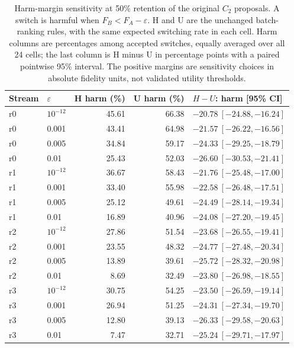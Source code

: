 \begin{table}[ht]
\centering
\scriptsize
\setlength{\tabcolsep}{3pt}
\caption{Harm-margin sensitivity at 50\% retention of the original $C_2$ proposals. A switch is harmful when $F_B<F_A-\varepsilon$. H and U are the unchanged batch-ranking rules, with the same expected switching rate in each cell. Harm columns are percentages among accepted switches, equally averaged over all 24 cells; the last column is H minus U in percentage points with a paired pointwise 95\% interval. The positive margins are sensitivity choices in absolute fidelity units, not validated utility thresholds.}
\label{tab:r4-harm-sensitivity}
\begin{tabular}{@{}llrrl@{}}
\toprule
Stream & $\varepsilon$ & H harm (\%) & U harm (\%) & $H-U$: harm [95\% CI] \\
\midrule
r0 & $10^{-12}$ & 45.61 & 66.38 & $-20.78\ [-24.88,-16.24]$ \\
r0 & 0.001 & 43.41 & 64.98 & $-21.57\ [-26.22,-16.56]$ \\
r0 & 0.005 & 34.84 & 59.17 & $-24.33\ [-29.25,-18.79]$ \\
r0 & 0.01 & 25.43 & 52.03 & $-26.60\ [-30.53,-21.41]$ \\
r1 & $10^{-12}$ & 36.67 & 58.43 & $-21.76\ [-25.48,-17.00]$ \\
r1 & 0.001 & 33.40 & 55.98 & $-22.58\ [-26.48,-17.51]$ \\
r1 & 0.005 & 25.12 & 49.61 & $-24.49\ [-28.14,-19.34]$ \\
r1 & 0.01 & 16.89 & 40.96 & $-24.08\ [-27.20,-19.45]$ \\
r2 & $10^{-12}$ & 27.86 & 51.54 & $-23.68\ [-26.55,-19.41]$ \\
r2 & 0.001 & 23.55 & 48.32 & $-24.77\ [-27.48,-20.34]$ \\
r2 & 0.005 & 13.89 & 39.61 & $-25.72\ [-28.32,-20.98]$ \\
r2 & 0.01 & 8.69 & 32.49 & $-23.80\ [-26.98,-18.55]$ \\
r3 & $10^{-12}$ & 30.75 & 54.25 & $-23.50\ [-26.59,-19.14]$ \\
r3 & 0.001 & 26.94 & 51.25 & $-24.31\ [-27.34,-19.70]$ \\
r3 & 0.005 & 12.80 & 39.13 & $-26.33\ [-29.58,-20.63]$ \\
r3 & 0.01 & 7.47 & 32.71 & $-25.24\ [-29.71,-17.97]$ \\
\bottomrule
\end{tabular}
\end{table}
